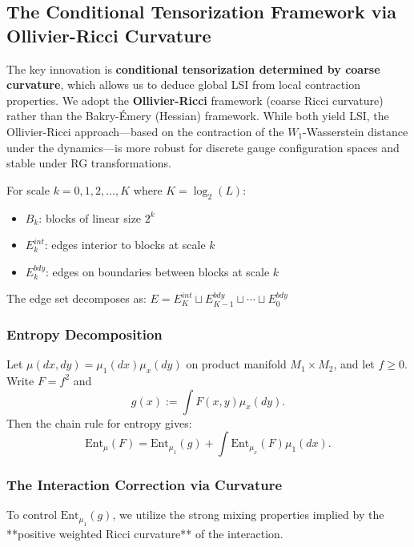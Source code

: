 \subsection{The Conditional Tensorization Framework via Ollivier-Ricci Curvature}

The key innovation is \textbf{conditional tensorization determined by coarse curvature}, which allows us to deduce global LSI from local contraction properties. We adopt the \textbf{Ollivier-Ricci} framework (coarse Ricci curvature) rather than the Bakry-Émery (Hessian) framework. While both yield LSI, the Ollivier-Ricci approach---based on the contraction of the $W_1$-Wasserstein distance under the dynamics---is more robust for discrete gauge configuration spaces and stable under RG transformations.

\begin{definition}
For scale $k = 0, 1, 2, \ldots, K$ where $K = \log_2(L)$:
\begin{itemize}
\item $B_k$: blocks of linear size $2^k$
\item $E_k^{int}$: edges interior to blocks at scale $k$
\item $E_k^{bdy}$: edges on boundaries between blocks at scale $k$
\end{itemize}

The edge set decomposes as: $E = E_K^{int} \sqcup E_{K-1}^{bdy} \sqcup \cdots \sqcup E_0^{bdy}$
\end{definition}

\subsubsection{Entropy Decomposition}
Let $\mu(dx,dy) = \mu_1(dx)\mu_x(dy)$ on product manifold $M_1 \times M_2$, and let $f \ge 0$. Write $F=f^2$ and
\begin{equation}
g(x) := \int F(x,y) \mu_x(dy).
\end{equation}
Then the chain rule for entropy gives:
\begin{equation}
\mathrm{Ent}_{\mu}(F) = \mathrm{Ent}_{\mu_1}(g) + \int \mathrm{Ent}_{\mu_x}(F) \mu_1(dx).
\end{equation}

\subsubsection{The Interaction Correction via Curvature}
To control $\mathrm{Ent}_{\mu_1}(g)$, we utilize the strong mixing properties implied by the **positive weighted Ricci curvature** of the interaction.

